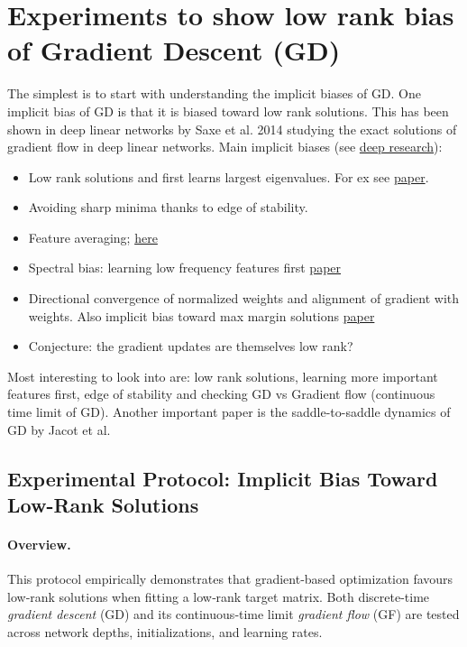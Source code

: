\documentclass[11pt]{article}
\begin{document}
\section*{Experiments to show low rank bias of Gradient Descent (GD)}
The simplest is to start with understanding the implicit biases of GD. One implicit bias of GD is that it is biased toward low rank solutions. This has been shown in deep linear networks by Saxe et al. 2014 studying the exact solutions of gradient flow in deep linear networks.
Main implicit biases (see \href{https://claude.ai/public/artifacts/c54b85ba-9f9b-4d01-8407-2e3a3ab4639b}{deep research}):
\begin{itemize}
    \item Low rank solutions and first learns largest eigenvalues. For ex see \href{https://arxiv.org/pdf/2011.13772}{paper}.
    \item Avoiding sharp minima thanks to edge of stability.
    \item Feature averaging; \href{https://arxiv.org/pdf/2410.10322}{here}
    \item Spectral bias: learning low frequency features first \href{https://arxiv.org/pdf/1806.08734}{paper}
    \item Directional convergence of normalized weights and alignment of gradient with weights. Also implicit bias toward max margin solutions \href{https://arxiv.org/pdf/2006.06657}{paper}
    \item Conjecture: the gradient updates are themselves low rank?
\end{itemize}
Most interesting to look into are: low rank solutions, learning more important features first, edge of stability and checking GD vs Gradient flow (continuous time limit of GD). Another important paper is the saddle-to-saddle dynamics of GD by Jacot et al.

\subsection*{Experimental Protocol: Implicit Bias Toward Low-Rank Solutions}
\label{sec:prot}

\paragraph{Overview.}
This protocol empirically demonstrates that gradient‐based optimization favours low‐rank solutions when fitting a low‐rank target matrix.  Both discrete-time \emph{gradient descent} (GD) and its continuous‐time limit \emph{gradient flow} (GF) are tested across network depths, initializations, and learning rates.
\end{document}
